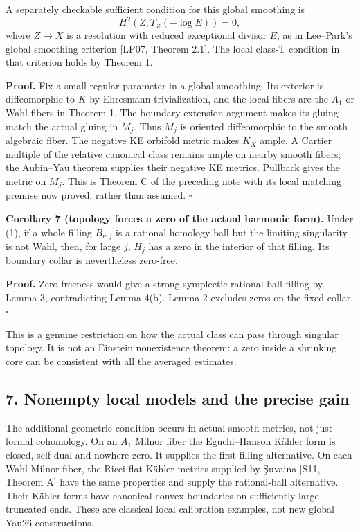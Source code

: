 \documentclass[
  11pt,
]{article}
\begin{document}
A separately checkable sufficient condition for this global smoothing is
\[
                 H^2(Z,T_Z(-\log E))=0,                \tag{13}
\] where \(Z\to X\) is a resolution with reduced exceptional divisor
\(E\), as in Lee--Park's global smoothing criterion {[}LP07, Theorem
2.1{]}. The local class-T condition in that criterion holds by Theorem
1.

\textbf{Proof.} Fix a small regular parameter in a global smoothing. Its
exterior is diffeomorphic to \(K\) by Ehresmann trivialization, and the
local fibers are the \(A_1\) or Wahl fibers in Theorem 1. The boundary
extension argument makes its gluing match the actual gluing in \(M_j\).
Thus \(M_j\) is oriented diffeomorphic to the smooth algebraic fiber.
The negative KE orbifold metric makes \(K_X\) ample. A Cartier multiple
of the relative canonical class remains ample on nearby smooth fibers;
the Aubin--Yau theorem supplies their negative KE metrics. Pullback
gives the metric on \(M_j\). This is Theorem C of the preceding note
with its local matching premise now proved, rather than assumed.
\(\square\)

\textbf{Corollary 7 (topology forces a zero of the actual harmonic
form).} Under (1), if a whole filling \(B_{\nu,j}\) is a rational
homology ball but the limiting singularity is not Wahl, then, for large
\(j\), \(H_j\) has a zero in the interior of that filling. Its boundary
collar is nevertheless zero-free.

\textbf{Proof.} Zero-freeness would give a strong symplectic
rational-ball filling by Lemma 3, contradicting Lemma 4(b). Lemma 2
excludes zeros on the fixed collar. \(\square\)

This is a genuine restriction on how the actual class can pass through
singular topology. It is not an Einstein nonexistence theorem: a zero
inside a shrinking core can be consistent with all the averaged
estimates.

\hypertarget{nonempty-local-models-and-the-precise-gain}{%
\subsection{7. Nonempty local models and the precise
gain}\label{nonempty-local-models-and-the-precise-gain}}

The additional geometric condition occurs in actual smooth metrics, not
just formal cohomology. On an \(A_1\) Milnor fiber the Eguchi--Hanson
Kähler form is closed, self-dual and nowhere zero. It supplies the first
filling alternative. On each Wahl Milnor fiber, the Ricci-flat Kähler
metrics supplied by Şuvaina {[}S11, Theorem A{]} have the same
properties and supply the rational-ball alternative. Their Kähler forms
have canonical convex boundaries on sufficiently large truncated ends.
These are classical local calibration examples, not new global Yau26
constructions.
\end{document}

